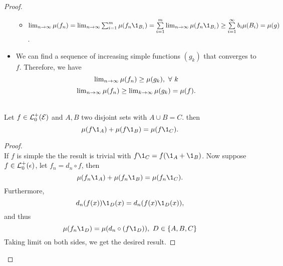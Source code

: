 \begin{proof}
\begin{itemize}
\begin{itemize}
        \item $\limm{n}{\infty} \mu(f_n) = \limm n \infty \sum_{i=1}^m \mu(f_n \1_{B_i}) = \summ{i=1}{m} \limm n \infty \mu(f_n \1_{B_i}) \geq \summ{i=1}{\infty} b_i \mu(B_i) = \mu(g)$.
    \end{itemize}
    \item We can find a sequence of increasing simple functions $(g_k)$ that converges to $f$. Therefore, we have
    \begin{equation*}
        \textstyle\lim_{n \to \infty} \mu(f_n) \geq \mu(g_k),\ \forall\ k
    \end{equation*}
    \begin{equation*}
        \textstyle\lim_{n \to \infty} \mu(f_n) \geq \textstyle\lim_{k \to \infty} \mu(g_k) = \mu(f).
    \end{equation*}
\end{itemize}


\begin{lemma}\ \\
Let $f \in \mathcal{L}_0^+(\mathcal{E})$ and $A,B$ two disjoint sets with $A \cup B = C$. then
\begin{equation*}
    \mu(f \1_A) + \mu(f \1_B) = \mu(f \1_C).
\end{equation*}
\begin{proof}\ \\
If $f$ is simple the the result is trivial with $f \1_C = f(\1_A + \1_B)$. Now suppose $f \in \mathcal{L}_0^+(\epsilon)$, let $f_{n} = d_n \circ f$, then
\begin{equation*}
    \mu(f_n \1_A) + \mu(f_n \1_B) = \mu(f_n \1_C).
\end{equation*}
Furthermore, 
\begin{equation*}
    d_n(f(x)) \1_D(x) = d_n (f(x) \1_D(x)),
\end{equation*}
and thus
\begin{equation*}
    \mu(f_n \1_D) = \mu(d_n \circ (f \1_D)),\ D \in \{A,B,C\}
\end{equation*}
Taking limit on both sides, we get the desired result.
\end{proof}
\end{lemma}
\end{proof}


